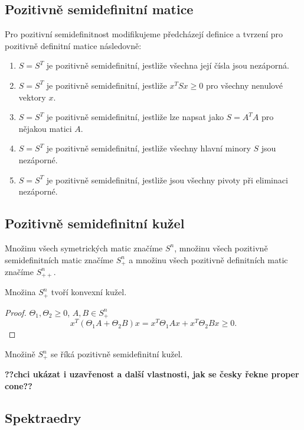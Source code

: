 \subsection*{Pozitivně semidefinitní matice}

Pro pozitivní semidefinitnost modifikujeme předcházejí definice a tvrzení pro pozitivně definitní matice následovně:
\begin{enumerate}
    \item $S = S^T$ je pozitivně semidefinitní, jestliže všechna její čísla jsou nezáporná.
    \item $S = S^T$ je pozitivně semidefinitní, jestliže $x^TSx \geq 0$ pro všechny nenulové vektory $x$.
    \item $S = S^T$ je pozitivně semidefinitní, jestliže lze napsat jako $S = A^T A$ pro nějakou matici $A$.
    \item $S = S^T$ je pozitivně semidefinitní, jestliže všechny hlavní minory $S$ jsou nezáporné.
    \item $S = S^T$ je pozitivně semidefinitní, jestliže jsou všechny pivoty při eliminaci nezáporné.
\end{enumerate}

\subsection*{Pozitivně semidefinitní kužel}

Množinu všech symetrických matic značíme $S^n$, množinu všech pozitivně semidefinitních matic značíme $S_+^n$ a množinu všech pozitivně definitních matic značíme $S_{++}^n$. 

\begin{vt}
    Množina $S_+^n$ tvoří konvexní kužel.
\end{vt}

\begin{proof}
    $\Theta_1, \Theta_2 \geq 0$, $A, B \in S_+^n$
    $$
        x^T \left( \Theta_1 A + \Theta_2 B \right) x = x^T \Theta_1 A x + x^T \Theta_2 B x \geq 0.
    $$
\end{proof}

Množině $S_+^n$ se říká pozitivně semidefinitní kužel.

\noindent\textbf{??chci ukázat i uzavřenost a další vlastnosti, jak se česky řekne proper cone??}

\subsection*{Spektraedry}

